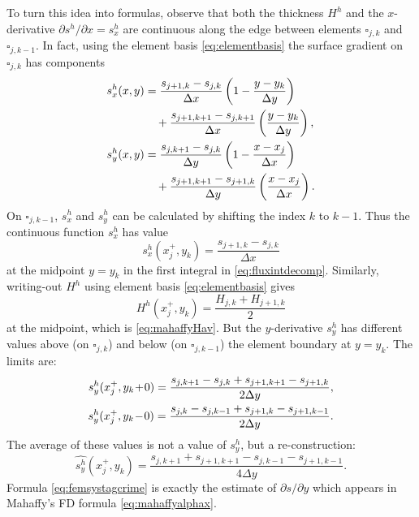 \documentclass[twocolumn,a4paper]{igs}
\begin{document}
To turn this idea into formulas, observe that both the thickness $H^h$ and the $x$-derivative $\partial s^h/\partial x = s^h_x$ are continuous along the edge between elements $\square_{j,k}$ and $\square_{j,k-1}$.  In fact, using the element basis \eqref{eq:elementbasis} the surface gradient on $\square_{j,k}$ has components
\begin{align}
s^h_x(x,y) &= \frac{s_{j+1,k}-s_{j,k}}{\Delta x} \left(1-\frac{y-y_k}{\Delta y}\right)  \label{eq:grads} \\
   &\quad + \frac{s_{j+1,k+1}-s_{j,k+1}}{\Delta x} \left(\frac{y-y_k}{\Delta y}\right), \notag \\
s^h_y(x,y) &= \frac{s_{j,k+1}-s_{j,k}}{\Delta y} \left(1-\frac{x-x_j}{\Delta x}\right) \notag \\
   &\quad + \frac{s_{j+1,k+1}-s_{j+1,k}}{\Delta y} \left(\frac{x-x_j}{\Delta x}\right). \notag
\end{align}
On $\square_{j,k-1}$, $s^h_x$ and $s^h_y$ can be calculated by shifting the index $k$ to $k-1$.  Thus the continuous function $s^h_x$ has value
\begin{equation}
s^h_x(x_j^+,y_k) = \frac{s_{j+1,k}-s_{j,k}}{\Delta x} \label{eq:femsxstag}
\end{equation}
at the midpoint $y=y_k$ in the first integral in \eqref{eq:fluxintdecomp}.  Similarly, writing-out $H^h$ using element basis \eqref{eq:elementbasis} gives
\begin{equation}
H^h(x_j^+,y_k) = \frac{H_{j,k}+H_{j+1,k}}{2} \label{eq:femHstag}
\end{equation}
at the midpoint, which is \eqref{eq:mahaffyHav}.  But the $y$-derivative $s^h_y$ has different values above (on $\square_{j,k}$) and below (on $\square_{j,k-1}$) the element boundary at $y = y_k$.  The limits are:
\begin{align}
s^h_y(x_j^+,y_k\!+\!0) = \frac{s_{j,k+1}-s_{j,k} + s_{j+1,k+1}-s_{j+1,k}}{2\Delta y}, \\
s^h_y(x_j^+,y_k\!-\!0) = \frac{s_{j,k}-s_{j,k-1} + s_{j+1,k}-s_{j+1,k-1}}{2\Delta y}. \notag
\end{align}
The average of these values is not a value of $s_y^h$, but a re-construction:
\begin{equation}
\widehat{s^h_y}(x_j^+,y_k) = \frac{s_{j,k+1} + s_{j+1,k+1} - s_{j,k-1} - s_{j+1,k-1}}{4\Delta y}. \label{eq:femsystagcrime}
\end{equation}
Formula \eqref{eq:femsystagcrime} is exactly the estimate of $\partial s/\partial y$ which appears in Mahaffy's FD formula \eqref{eq:mahaffyalphax}.
\end{document}
